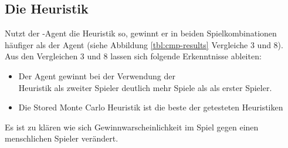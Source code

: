 \subsection{Die Heuristik }
\label{fz:h_smc}
Nutzt der \mxZitat{\abp}-Agent die  Heuristik so, gewinnt er in beiden Spielkombinationen häufiger als der  Agent (siehe Abbildung \ref{tbl:cmp-results} Vergleiche 3 und 8).
\\Aus den Vergleichen 3 und 8 lassen sich folgende Erkenntnisse ableiten:
\begin{itemize}
\item Der Agent \mxZitat{\abp} gewinnt bei der Verwendung der \\ Heuristik als zweiter Spieler deutlich mehr Spiele als als erster Spieler.
\item {\color{red} Die Stored Monte Carlo Heuristik ist die beste der getesteten Heuristiken}
\end{itemize}
Es ist zu klären wie sich Gewinnwarscheinlichkeit im Spiel gegen einen menschlichen Spieler verändert.
\vspace{0.5cm}
\vspace{0.5cm}
